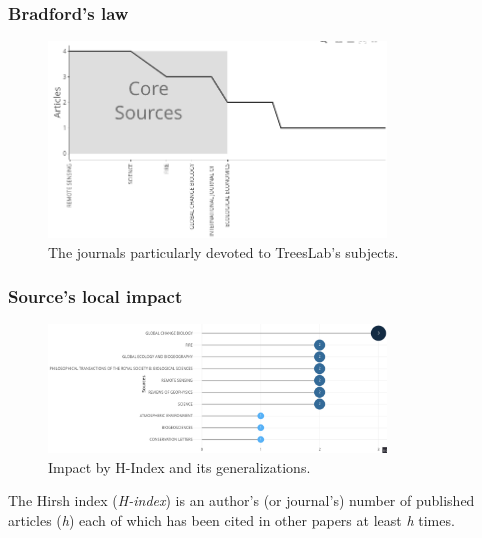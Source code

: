 \documentclass[aspectratio=169]{beamer}
\begin{document}
\begin{frame}
  \frametitle{Bradford's law}
  \begin{figure}
    \centering
    \includegraphics[width=0.8\textwidth]{img/bradfords_law.png}
    \caption{The journals particularly devoted to TreesLab's subjects.}
    \label{fig:bradfords_law}
  \end{figure}
\end{frame}

\begin{frame}
  \frametitle{Source's local impact}
  \begin{figure}
    \centering
    \includegraphics[width=0.8\textwidth]{img/sources_local_impact.png}
    \caption{Impact by H-Index and its generalizations.}
    \label{fig:sources_local_impact}
  \end{figure}
  The Hirsh index (\emph{H-index}) is an author's (or journal's) number of 
  published articles (\emph{h}) each of which has been cited in other papers 
  at least \emph{h} times.
\end{frame}
\end{document}

